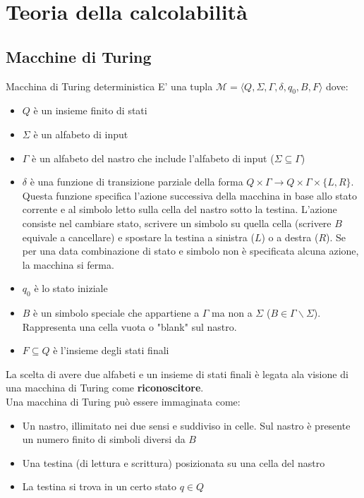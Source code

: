 \documentclass[12pt, a4paper]{report}
\begin{document}
    \chapter{Teoria della calcolabilità}
        \section{Macchine di Turing}
            \begin{definitionbox}{Macchina di Turing deterministica}{}
                E' una tupla $\mathcal{M}=\langle Q,\Sigma,\Gamma,\delta,q_0,B,F\rangle$ dove:
                \begin{itemize}
                    \item $Q$ è un insieme finito di stati
                    \item $\Sigma$ è un alfabeto di input
                    \item $\Gamma$ è un alfabeto del nastro che include l'alfabeto di input ($\Sigma\subseteq\Gamma$)
                    \item $\delta$ è una funzione di transizione parziale della forma $Q \times \Gamma \to Q \times \Gamma \times \{L,R\}$. Questa funzione specifica l'azione successiva della macchina in base allo stato corrente e al simbolo letto sulla cella del nastro sotto la testina. L'azione consiste nel cambiare stato, scrivere un simbolo su quella cella (scrivere $B$ equivale a cancellare) e spostare la testina a sinistra ($L$) o a destra ($R$). Se per una data combinazione di stato e simbolo non è specificata alcuna azione, la macchina si ferma.
                    \item $q_0$ è lo stato iniziale
                    \item $B$ è un simbolo speciale che appartiene a $\Gamma$ ma non a $\Sigma$ ($B\in\Gamma\smallsetminus\Sigma$). Rappresenta una cella vuota o "blank" sul nastro.
                    \item $F\subseteq Q$ è l'insieme degli stati finali
                \end{itemize}
            \end{definitionbox}
            La scelta di avere due alfabeti e un insieme di stati finali è legata ala visione di una macchina di Turing come \textbf{riconoscitore}.\\
            Una macchina di Turing può essere immaginata come:
            \begin{itemize}
                \item Un nastro, illimitato nei due sensi e suddiviso in celle. Sul nastro è presente un numero finito di simboli diversi da $B$
                \item Una testina (di lettura e scrittura) posizionata su una cella del nastro
                \item La testina si trova in un certo stato $q\in Q$
            \end{itemize}
\end{document}
